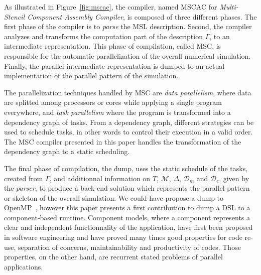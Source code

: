 As illustrated in Figure~\ref{fig:mscac}, the compiler, named MSCAC for \emph{Multi-Stencil Component Assembly Compiler}, is composed of three different phases. The first phase of the compiler is to \emph{parse} the MSL description. Second, the compiler analyzes and transforms the computation part of the description $\Gamma$, to an intermediate representation. This phase of compilation, called MSC, is responsible for the automatic parallelization of the overall numerical simulation. Finally, the parallel intermediate representation is dumped to an actual implementation of the parallel pattern of the simulation.


The parallelization techniques handled by MSC are \emph{data parallelism}, where data are splitted among processors or cores while applying a single program everywhere, and \emph{task parallelism} where the program is transformed into a dependency graph of tasks. From a dependency graph, different strategies can be used to schedule tasks, in other words to control their execution in a valid order. The MSC compiler presented in this paper handles the transformation of the dependency graph to a static scheduling.

The final phase of compilation, the dump, uses the static schedule of the tasks, created from $\Gamma$, and additionnal information on $T$, $\mathcal{M}$, $\Delta$, $\mathcal{D}_m$ and $\mathcal{D}_c$, given by the \emph{parser}, to produce a back-end solution which represents the parallel pattern or skeleton of the overall simulation. We could have propose a dump to OpenMP~\cite{660313}, however this paper presents a first contribution to dump a DSL to a component-based runtime. Component models, where a component represents a clear and independent functionnality of the application, have first been proposed in software engineering and have proved many times good properties for code re-use, separation of concerns, maintainability and productivity of codes. Those properties, on the other hand, are recurrent stated problems of parallel applications.

